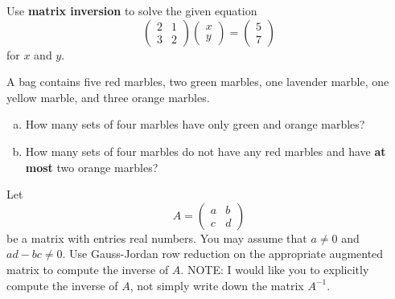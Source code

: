\documentclass[12pt]{amsart}
\begin{document}
\begin{thm}[10 Points]
  Use {\bf matrix inversion} to solve the given equation
  $$\left(\begin{array}{rr}
    2 & 1 \\
    3 & 2
  \end{array}\right) \left(\begin{array}{r}
    x \\
    y
  \end{array}\right) = \left(\begin{array}{r}
    5 \\
    7
  \end{array}\right)$$
  for $x$ and $y$.
  
\end{thm}
\newpage


\begin{thm}[10 Points]\label{ex1}
  A bag contains five red marbles, two green marbles, one lavender marble, one yellow marble, and three orange marbles.
  \begin{enumerate}[(a)]
  \item
    How many sets of four marbles have only green and orange marbles?
    \vspace{2in}
  \item
    How many sets of four marbles do not have any red marbles and have {\bf at most} two orange marbles?
    \vspace{2in}
  \end{enumerate}
\end{thm}

\newpage

\begin{thm}\label{bonus}
  Let 
  $$A = \left(\begin{array}{cc} 
    a & b\\
    c & d
  \end{array}\right)$$
  be a matrix with entries real numbers.
  You may assume that $a \neq 0$ and $ad - bc \neq 0$.
  Use Gauss-Jordan row reduction on the appropriate augmented matrix to compute the inverse of $A$.
  NOTE:  I would like you to explicitly compute the inverse of $A$, not simply write down the matrix $A^{-1}$.
\end{thm}

\end{document}
